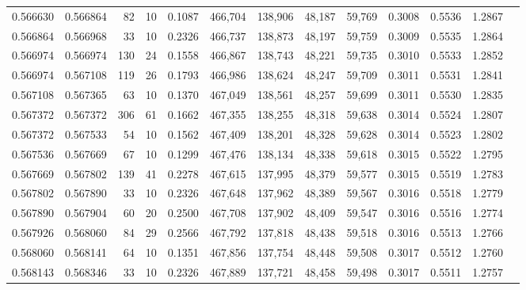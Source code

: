 \begin{tabular}{rrrrrrrrrrrrr}
0.566630 & 0.566864 &    82 &  10 &                                     0.1087 & 466,704 & 138,906 &  48,187 &  59,769 & 0.3008 & 0.5536 & 1.2867 \\
0.566864 & 0.566968 &    33 &  10 &                                     0.2326 & 466,737 & 138,873 &  48,197 &  59,759 & 0.3009 & 0.5535 & 1.2864 \\
0.566974 & 0.566974 &   130 &  24 &                                     0.1558 & 466,867 & 138,743 &  48,221 &  59,735 & 0.3010 & 0.5533 & 1.2852 \\
0.566974 & 0.567108 &   119 &  26 &                                     0.1793 & 466,986 & 138,624 &  48,247 &  59,709 & 0.3011 & 0.5531 & 1.2841 \\
0.567108 & 0.567365 &    63 &  10 &                                     0.1370 & 467,049 & 138,561 &  48,257 &  59,699 & 0.3011 & 0.5530 & 1.2835 \\
0.567372 & 0.567372 &   306 &  61 &                                     0.1662 & 467,355 & 138,255 &  48,318 &  59,638 & 0.3014 & 0.5524 & 1.2807 \\
0.567372 & 0.567533 &    54 &  10 &                                     0.1562 & 467,409 & 138,201 &  48,328 &  59,628 & 0.3014 & 0.5523 & 1.2802 \\
0.567536 & 0.567669 &    67 &  10 &                                     0.1299 & 467,476 & 138,134 &  48,338 &  59,618 & 0.3015 & 0.5522 & 1.2795 \\
0.567669 & 0.567802 &   139 &  41 &                                     0.2278 & 467,615 & 137,995 &  48,379 &  59,577 & 0.3015 & 0.5519 & 1.2783 \\
0.567802 & 0.567890 &    33 &  10 &                                     0.2326 & 467,648 & 137,962 &  48,389 &  59,567 & 0.3016 & 0.5518 & 1.2779 \\
0.567890 & 0.567904 &    60 &  20 &                                     0.2500 & 467,708 & 137,902 &  48,409 &  59,547 & 0.3016 & 0.5516 & 1.2774 \\
0.567926 & 0.568060 &    84 &  29 &                                     0.2566 & 467,792 & 137,818 &  48,438 &  59,518 & 0.3016 & 0.5513 & 1.2766 \\
0.568060 & 0.568141 &    64 &  10 &                                     0.1351 & 467,856 & 137,754 &  48,448 &  59,508 & 0.3017 & 0.5512 & 1.2760 \\
0.568143 & 0.568346 &    33 &  10 &                                     0.2326 & 467,889 & 137,721 &  48,458 &  59,498 & 0.3017 & 0.5511 & 1.2757 \\

\end{tabular}
